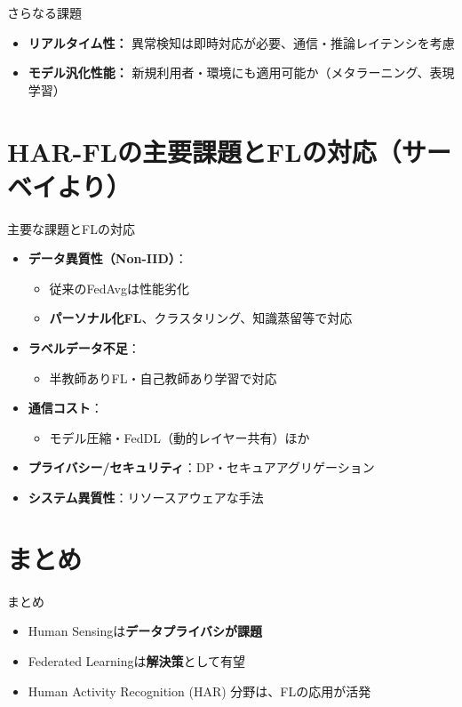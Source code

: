 \documentclass[unicode,12pt,aspectratio=169,dvipdfmx]{beamer}
\begin{document}
\begin{frame}{さらなる課題}
  \begin{itemize}
    \item \textbf{リアルタイム性：} 異常検知は即時対応が必要、通信・推論レイテンシを考慮
    \item \textbf{モデル汎化性能：} 新規利用者・環境にも適用可能か（メタラーニング、表現学習）
  \end{itemize}
\end{frame}


\section{HAR-FLの主要課題とFLの対応（サーベイより）}

\begin{frame}{主要な課題とFLの対応}
  \begin{itemize}
    \item \textbf{データ異質性（Non-IID）}：
      \begin{itemize}
        \item 従来のFedAvgは性能劣化
        \item \textbf{パーソナル化FL}、クラスタリング、知識蒸留等で対応
      \end{itemize}
    \item \textbf{ラベルデータ不足}：
      \begin{itemize}
        \item 半教師ありFL・自己教師あり学習で対応
      \end{itemize}
    \item \textbf{通信コスト}：
      \begin{itemize}
        \item モデル圧縮・FedDL（動的レイヤー共有）ほか
      \end{itemize}
    \item \textbf{プライバシー/セキュリティ}：DP・セキュアアグリゲーション
    \item \textbf{システム異質性}：リソースアウェアな手法
  \end{itemize}
\end{frame}


\section{まとめ}
\begin{frame}{まとめ}
    \begin{itemize}
        \item Human Sensingは\textbf{データプライバシが課題}
        \item Federated Learningは\textbf{解決策}として有望
        \item Human Activity Recognition (HAR) 分野は、FLの応用が活発
    \end{itemize}
\end{frame}
\end{document}
